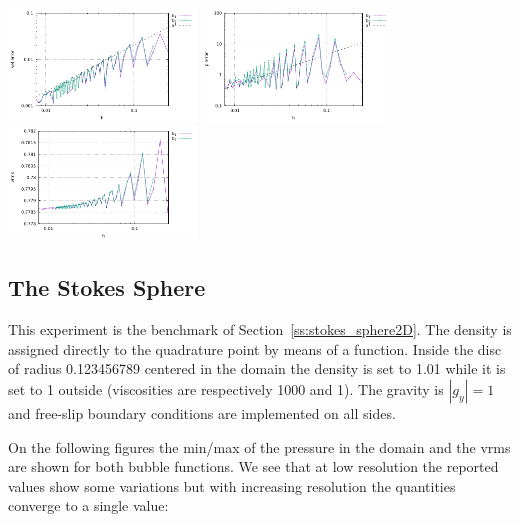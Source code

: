\begin{center}
\includegraphics[width=5cm]{python_codes/fieldstone_72/results/solvi/errors_v}
\includegraphics[width=5cm]{python_codes/fieldstone_72/results/solvi/errors_p}
\includegraphics[width=5cm]{python_codes/fieldstone_72/results/solvi/vrms}
\end{center}



\subsection*{The Stokes Sphere}

This experiment is the benchmark of Section~\ref{ss:stokes_sphere2D}. 
The density is assigned directly to the 
quadrature point by means of a function. Inside the disc of radius 0.123456789 centered in the domain 
the density is set to 1.01 while it is set to 1 outside 
(viscosities are respectively 1000 and 1). The gravity is $|g_y|=1$ and 
free-slip boundary conditions are implemented on all sides. 

On the following figures the min/max of the pressure in the domain and the vrms 
are shown for both bubble functions. We see that at low resolution the reported 
values show some variations but with increasing resolution the quantities converge to a single value:


